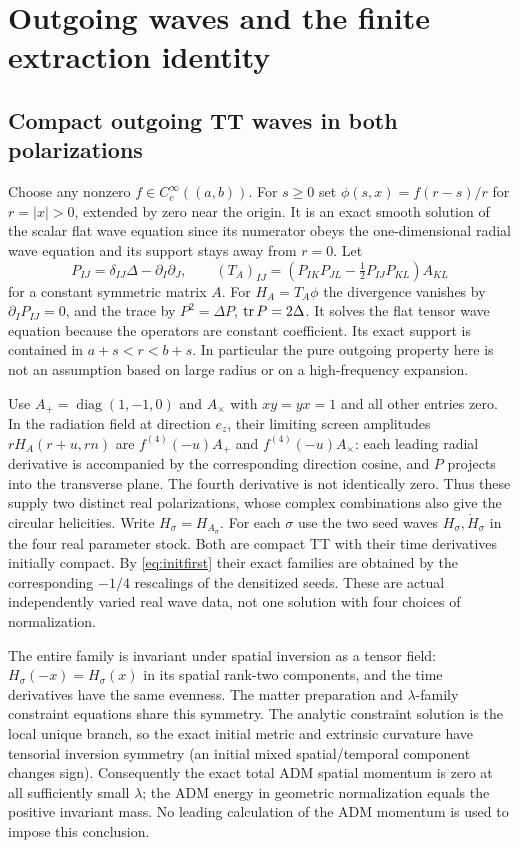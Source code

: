 \section{Outgoing waves and the finite extraction identity}\label{sec:radiation}

\subsection{Compact outgoing TT waves in both polarizations}

Choose any nonzero \(f\in C^\infty_c((a,b))\). For \(s\geq0\) set
\(\phi(s,x)=f(r-s)/r\) for \(r=|x|>0\), extended by zero near the origin. It is an exact smooth solution of the scalar flat wave equation since its numerator obeys the one-dimensional radial wave equation and its support stays away from \(r=0\). Let
\[
 P_{IJ}=\delta_{IJ}\Delta-\partial_I\partial_J,\qquad
 (T_A)_{IJ}=\left(P_{IK}P_{JL}-\tfrac12 P_{IJ}P_{KL}\right)A_{KL}
\]
for a constant symmetric matrix \(A\). For \(H_A=T_A\phi\) the divergence vanishes by \(\partial_I P_{IJ}=0\), and the trace by \(P^2=\Delta P\), \(\operatorname{tr} P=2\Delta\). It solves the flat tensor wave equation because the operators are constant coefficient. Its exact support is contained in \(a+s<r<b+s\). In particular the pure outgoing property here is not an assumption based on large radius or on a high-frequency expansion.

Use \(A_+=\operatorname{diag}(1,-1,0)\) and \(A_\times\) with \(xy=yx=1\) and all other entries zero. In the radiation field at direction \(e_z\), their limiting screen amplitudes \(rH_A(r+u,rn)\) are \(f^{(4)}(-u)A_+\) and \(f^{(4)}(-u)A_\times\): each leading radial derivative is accompanied by the corresponding direction cosine, and \(P\) projects into the transverse plane. The fourth derivative is not identically zero. Thus these supply two distinct real polarizations, whose complex combinations also give the circular helicities. Write \(H_\sigma=H_{A_\sigma}\). For each \(\sigma\) use the two seed waves \(H_\sigma,\dot H_\sigma\) in the four real parameter stock. Both are compact TT with their time derivatives initially compact. By \eqref{eq:initfirst} their exact families are obtained by the corresponding \(-1/4\) rescalings of the densitized seeds. These are actual independently varied real wave data, not one solution with four choices of normalization.

The entire family is invariant under spatial inversion as a tensor field: \(H_\sigma(-x)=H_\sigma(x)\) in its spatial rank-two components, and the time derivatives have the same evenness. The matter preparation and \(\lambda\)-family constraint equations share this symmetry. The analytic constraint solution is the local unique branch, so the exact initial metric and extrinsic curvature have tensorial inversion symmetry (an initial mixed spatial/temporal component changes sign). Consequently the exact total ADM spatial momentum is zero at all sufficiently small \(\lambda\); the ADM energy in geometric normalization equals the positive invariant mass. No leading calculation of the ADM momentum is used to impose this conclusion.

